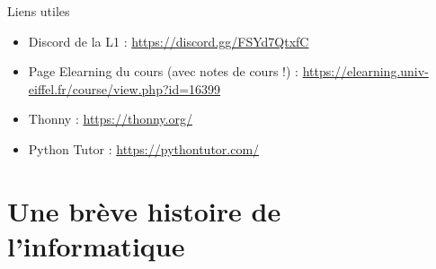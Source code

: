 \documentclass{beamer}
\begin{document}
\begin{frame}{Liens utiles}
    \large
    \begin{itemize}
        \item Discord de la L1 : \url{https://discord.gg/FSYd7QtxfC}
        \item {Page Elearning du cours} (avec notes de cours !) : \url{https://elearning.univ-eiffel.fr/course/view.php?id=16399}
        \item Thonny : \url{https://thonny.org/}
        \item Python Tutor : \url{https://pythontutor.com/}
    \end{itemize}
\end{frame}

\section{Une brève histoire de l'informatique}
\end{document}
